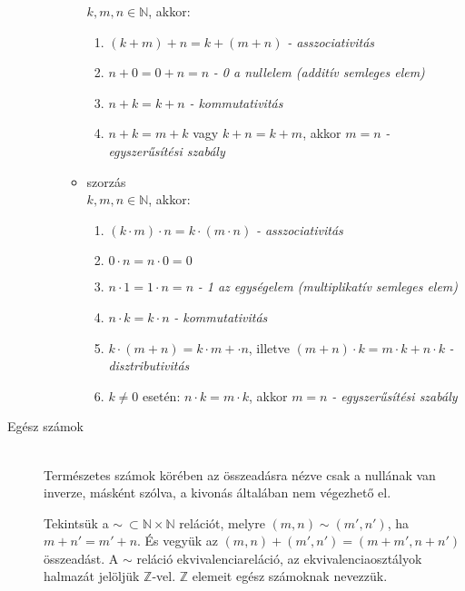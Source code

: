 \documentclass[margin=0px]{article}
\newcommand{\N}{\mathbb{N}}
\newcommand{\Z}{\mathbb{Z}}
\begin{document}
\begin{description}
\begin{itemize}
\begin{itemize}
                            $k,m,n \in \N$, akkor:
                            \begin{enumerate}
                                \item $(k+m)+n = k+(m+n)$ \textit{- asszociativitás}
                                \item $n+0 = 0+n = n$ \textit{- 0 a nullelem (additív semleges elem)}
                                \item $n+k = k+n$ \textit{- kommutativitás}
                                \item $n+k = m+k$ vagy $k+n = k+m$, akkor $m=n$ \textit{- egyszerűsítési szabály}
                            \end{enumerate}
                      \item szorzás \\
                            $k,m,n \in \N$, akkor:
                            \begin{enumerate}
                                \item $(k\cdot m)\cdot n = k\cdot (m\cdot n)$ \textit{- asszociativitás}
                                \item $ 0\cdot n = n\cdot 0 = 0$
                                \item $n\cdot 1 = 1\cdot n = n$ \textit{- 1 az egységelem (multiplikatív semleges elem)}
                                \item $n\cdot k = k\cdot n$ \textit{- kommutativitás}
                                \item $k\cdot (m+n) = k\cdot m + \cdot n$, illetve $(m+n) \cdot k = m\cdot k+n\cdot k$ \textit{- disztributivitás}
                                \item $k\neq 0$ esetén: $n\cdot k = m\cdot k$, akkor $m=n$ \textit{- egyszerűsítési szabály}
                            \end{enumerate}
                  \end{itemize}
        \end{itemize}
    \item[Egész számok] \hfill \\
        Természetes számok körében az összeadásra nézve csak a nullának van inverze, másként szólva, a kivonás általában nem végezhető el.

        Tekintsük a $\sim\ \subset\N\times\N$ relációt, melyre $(m,n) \sim (m',n')$, ha $m+n' = m'+n$. És vegyük az $(m,n)+(m',n') = (m+m',n+n')$ összeadást. A $\sim$ reláció ekvivalenciareláció, az ekvivalenciaosztályok halmazát jelöljük $\Z$-vel. $\Z$ elemeit egész számoknak nevezzük.


\end{description}
\end{document}
